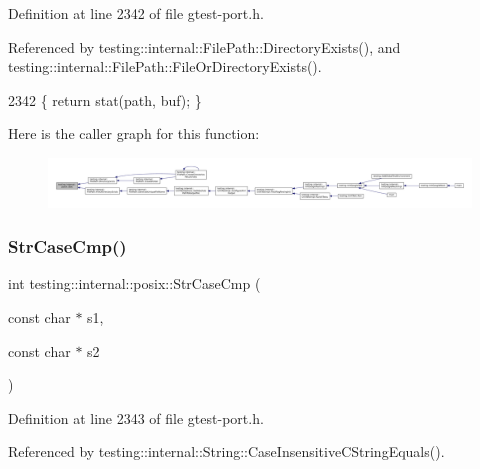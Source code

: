 Definition at line 2342 of file gtest-\/port.\+h.



Referenced by testing\+::internal\+::\+File\+Path\+::\+Directory\+Exists(), and testing\+::internal\+::\+File\+Path\+::\+File\+Or\+Directory\+Exists().


\begin{DoxyCode}
2342 \{ \textcolor{keywordflow}{return} stat(path, buf); \}
\end{DoxyCode}
Here is the caller graph for this function\+:
\nopagebreak
\begin{figure}[H]
\begin{center}
\leavevmode
\includegraphics[width=350pt]{namespacetesting_1_1internal_1_1posix_a2b87b7ff647a128614daf50667eb9304_icgraph}
\end{center}
\end{figure}
\mbox{\label{namespacetesting_1_1internal_1_1posix_a1ef2385a7f8e4c706054da35967e76bd}} 
\subsubsection{\texorpdfstring{Str\+Case\+Cmp()}{StrCaseCmp()}}
{\footnotesize\ttfamily int testing\+::internal\+::posix\+::\+Str\+Case\+Cmp (\begin{DoxyParamCaption}\item[{const char $\ast$}]{s1,  }\item[{const char $\ast$}]{s2 }\end{DoxyParamCaption})\hspace{0.3cm}{\ttfamily [inline]}}



Definition at line 2343 of file gtest-\/port.\+h.



Referenced by testing\+::internal\+::\+String\+::\+Case\+Insensitive\+C\+String\+Equals().



